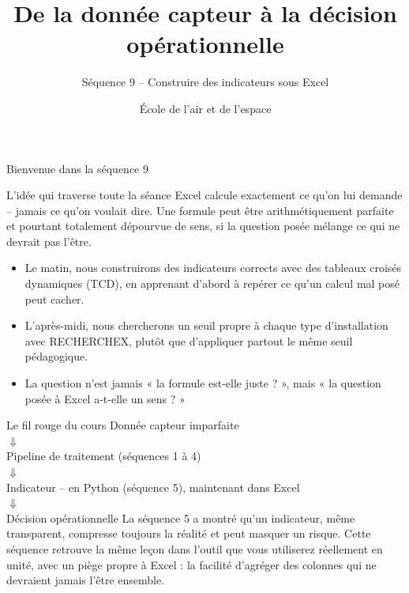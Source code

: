 \documentclass[aspectratio=169]{beamer}
\title{De la donnée capteur à la décision opérationnelle}
\subtitle{Séquence 9 -- Construire des indicateurs sous Excel}
\author{École de l'air et de l'espace}
\date{}
\begin{document}
\begin{frame}
  \titlepage
\end{frame}

\begin{frame}{Bienvenue dans la séquence 9}
  \begin{block}{L'idée qui traverse toute la séance}
    Excel calcule exactement ce qu'on lui demande -- jamais ce qu'on voulait dire. Une formule peut être arithmétiquement parfaite et pourtant totalement dépourvue de sens, si la question posée mélange ce qui ne devrait pas l'être.
  \end{block}
  \begin{itemize}
    \item Le matin, nous construirons des indicateurs corrects avec des tableaux croisés dynamiques (TCD), en apprenant d'abord à repérer ce qu'un calcul mal posé peut cacher.
    \item L'après-midi, nous chercherons un seuil propre à chaque type d'installation avec RECHERCHEX, plutôt que d'appliquer partout le même seuil pédagogique.
    \item La question n'est jamais « la formule est-elle juste ? », mais « la question posée à Excel a-t-elle un sens ? »
  \end{itemize}
\end{frame}

\begin{frame}{Le fil rouge du cours}
  \centering
  \Large Donnée capteur imparfaite\\[2mm]
  $\Downarrow$\\[-1mm]
  Pipeline de traitement (séquences 1 à 4)\\[-1mm]
  $\Downarrow$\\[-1mm]
  Indicateur \alert{\normalsize -- en Python (séquence 5), maintenant dans Excel}\\[-1mm]
  $\Downarrow$\\[-1mm]
  Décision opérationnelle
  \vfill
  \normalsize La séquence 5 a montré qu'un indicateur, même transparent, compresse toujours la réalité et peut masquer un risque. Cette séquence retrouve la même leçon dans l'outil que vous utiliserez réellement en unité, avec un piège propre à Excel : la facilité d'agréger des colonnes qui ne devraient jamais l'être ensemble.
\end{frame}
\end{document}
